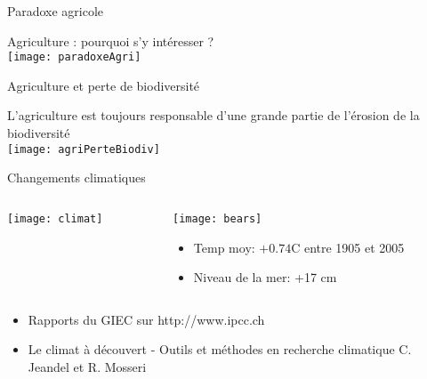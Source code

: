 \documentclass[10pt]{beamer}
\begin{document}
\begin{frame}{Paradoxe agricole}
\begin{center}
Agriculture : pourquoi s’y intéresser ?\\
\vspace{10pt}
 \texttt{[image: paradoxeAgri]}
 \end{center}
\end{frame}


\begin{frame}{Agriculture et perte de biodiversité}
\begin{center}
 L’agriculture est toujours responsable d’une grande partie de l’érosion de la biodiversité\\
 \vspace{10pt}
\texttt{[image: agriPerteBiodiv]}
 \end{center}
\end{frame}

\begin{frame}{Changements climatiques}
  \begin{columns}
    \begin{column}[c]{0.5\textwidth}
    \begin{center}
      \texttt{[image: climat]}
    \end{center}
    \end{column}
    \begin{column}[c]{0.5\textwidth}
 \begin{center}
       \texttt{[image: bears]}
      \end{center}
      \begin{itemize}
      \item Temp moy: $+0.74$\degres C  entre 1905 et 2005
      \item Niveau de la mer: +17 cm
      \end{itemize}
      \end{column}
  \end{columns}
  \begin{tiny}
    \begin{itemize}
    \item Rapports du GIEC sur http://www.ipcc.ch
    \item Le climat à découvert - Outils et méthodes en recherche climatique  C. Jeandel et R. Mosseri 
    \end{itemize}
  \end{tiny}
\end{frame}
\end{document}
